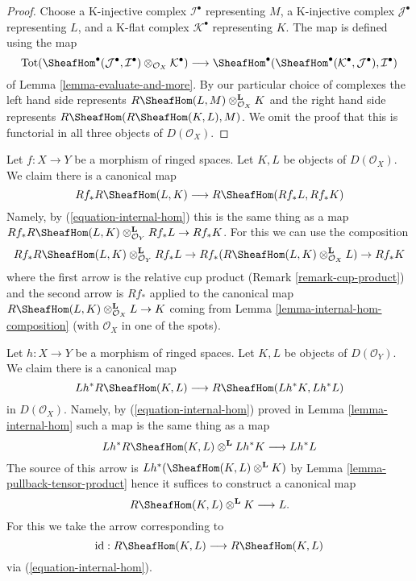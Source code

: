 \begin{proof}
Choose
a K-injective complex $\mathcal{I}^\bullet$ representing $M$,
a K-injective complex $\mathcal{J}^\bullet$ representing $L$, and
a K-flat complex $\mathcal{K}^\bullet$ representing $K$.
The map is defined using the map
$$
\text{Tot}(\SheafHom^\bullet(\mathcal{J}^\bullet,
\mathcal{I}^\bullet) \otimes_{\mathcal{O}_X} \mathcal{K}^\bullet)
\longrightarrow
\SheafHom^\bullet(\SheafHom^\bullet(\mathcal{K}^\bullet,
\mathcal{J}^\bullet), \mathcal{I}^\bullet)
$$
of Lemma \ref{lemma-evaluate-and-more}. By our particular
choice of complexes the left hand side represents
$R\SheafHom(L, M) \otimes_{\mathcal{O}_X}^\mathbf{L} K$
and the right hand side represents
$R\SheafHom(R\SheafHom(K, L), M)$. We omit the proof that
this is functorial in all three objects of $D(\mathcal{O}_X)$.
\end{proof}

\begin{remark}
\label{remark-projection-formula-for-internal-hom}
Let $f : X \to Y$ be a morphism of ringed spaces.
Let $K, L$ be objects of $D(\mathcal{O}_X)$. We claim there is a canonical map
$$
Rf_*R\SheafHom(L, K) \longrightarrow R\SheafHom(Rf_*L, Rf_*K)
$$
Namely, by (\ref{equation-internal-hom}) this is the same thing
as a map
$Rf_*R\SheafHom(L, K) \otimes_{\mathcal{O}_Y}^\mathbf{L} Rf_*L \to Rf_*K$.
For this we can use the composition
$$
Rf_*R\SheafHom(L, K) \otimes_{\mathcal{O}_Y}^\mathbf{L} Rf_*L \to
Rf_*(R\SheafHom(L, K) \otimes_{\mathcal{O}_X}^\mathbf{L} L) \to
Rf_*K
$$
where the first arrow is the relative cup product
(Remark \ref{remark-cup-product}) and the second arrow is $Rf_*$ applied
to the canonical map
$R\SheafHom(L, K) \otimes_{\mathcal{O}_X}^\mathbf{L} L \to K$
coming from Lemma \ref{lemma-internal-hom-composition}
(with $\mathcal{O}_X$ in one of the spots).
\end{remark}

\begin{remark}
\label{remark-prepare-fancy-base-change}
Let $h : X \to Y$ be a morphism of ringed spaces.
Let $K, L$ be objects of $D(\mathcal{O}_Y)$. We claim there is a
canonical map
$$
Lh^*R\SheafHom(K, L) \longrightarrow R\SheafHom(Lh^*K, Lh^*L)
$$
in $D(\mathcal{O}_X)$. Namely, by (\ref{equation-internal-hom})
proved in Lemma \ref{lemma-internal-hom}
such a map is the same thing as a map
$$
Lh^*R\SheafHom(K, L) \otimes^\mathbf{L} Lh^*K \longrightarrow Lh^*L
$$
The source of this arrow is $Lh^*(\SheafHom(K, L) \otimes^\mathbf{L} K)$
by Lemma \ref{lemma-pullback-tensor-product}
hence it suffices to construct a canonical map
$$
R\SheafHom(K, L) \otimes^\mathbf{L} K \longrightarrow L.
$$
For this we take the arrow corresponding to
$$
\text{id} :
R\SheafHom(K, L)
\longrightarrow
R\SheafHom(K, L)
$$
via (\ref{equation-internal-hom}).
\end{remark}

